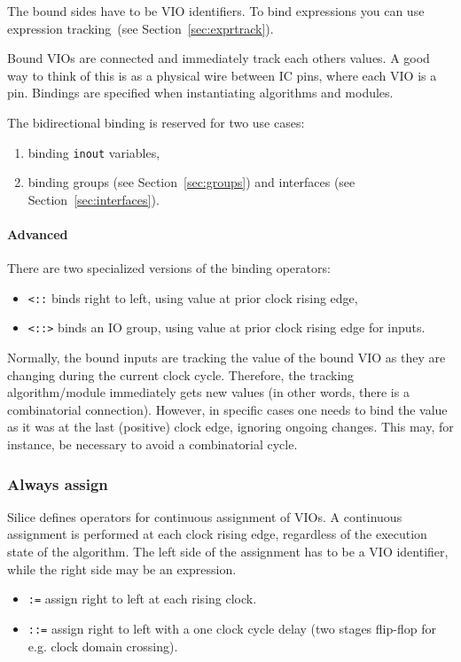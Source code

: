 \documentclass[a4]{article}
\newcommand\silice{Silice}
\begin{document}
The bound sides have to be VIO identifiers. To bind expressions you can use expression tracking~(see Section~\ref{sec:exprtrack}).

Bound VIOs are connected and immediately track each others values.
A good way to think of this is as a physical wire between IC pins, where each VIO is a pin.
Bindings are specified when instantiating algorithms and modules. 

The bidirectional binding is reserved for two use cases:
\begin{enumerate}
\item binding \texttt{inout} variables,
\item binding groups (see Section~\ref{sec:groups}) and interfaces (see Section~\ref{sec:interfaces}).
\end{enumerate}

\paragraph{Advanced}

There are two specialized versions of the binding operators:
\begin{itemize}
	\item \texttt{<::} binds right to left, using value at prior clock rising edge,
	\item \texttt{<::>} binds an IO group, using value at prior clock rising edge for inputs.
\end{itemize}

Normally, the bound inputs are tracking the value of the bound VIO as they are changing during the current clock cycle. Therefore, the tracking algorithm/module immediately gets new values (in other words, there is a combinatorial connection). However, in specific cases one needs to bind the value as it was at the last (positive) clock edge, ignoring ongoing changes. This may, for instance, be necessary to avoid a combinatorial cycle.

\subsubsection{Always assign}
\label{sec:contassign}

\silice{} defines operators for continuous assignment of VIOs.
A continuous assignment is performed at each clock rising edge, regardless of the execution state of the algorithm. The left side of the assignment has to be a VIO identifier, while the right side may be an expression.
\begin{itemize}
\item \texttt{:=} assign right to left at each rising clock.
\item \texttt{::=} assign right to left with a one clock cycle delay (two stages flip-flop for e.g. clock domain crossing).
\end{itemize}
\end{document}
